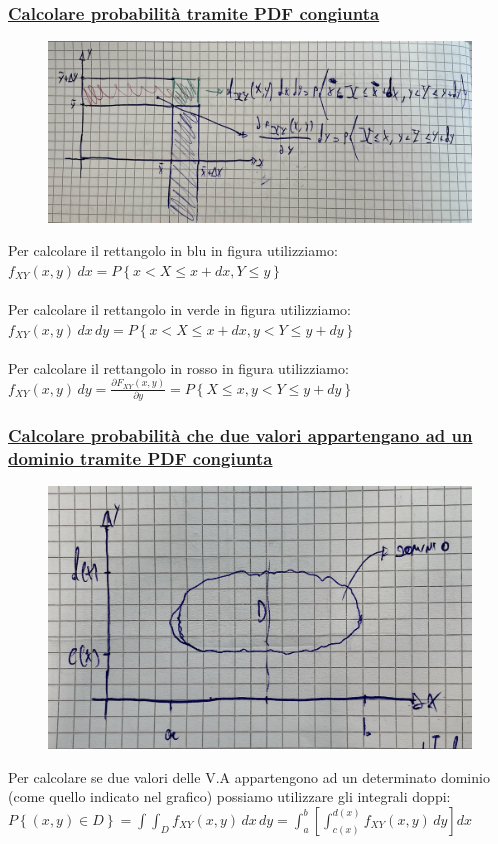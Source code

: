 \documentclass{article}
\begin{document}
\subsubsection{\underline{Calcolare probabilità tramite PDF congiunta}}
\begin{figure}[H]
\centering
\includegraphics[scale=0.14]{images/78.CalcoloProbPDFCong.jpeg}
\end{figure} 
Per calcolare il rettangolo in blu in figura utilizziamo: \\
$f_{XY}(x,y)\,dx = P \left\{x < X \leq x + dx,Y \leq y\right\}$ \\ \\
Per calcolare il rettangolo in verde in figura utilizziamo: \\
$f_{XY}(x,y)\,dx\,dy = P \left\{x < X \leq x + dx, y < Y \leq y +dy\right\}$ \\ \\
Per calcolare il rettangolo in rosso in figura utilizziamo: \\
$f_{XY}(x,y)\,dy = \frac{\partial F_{XY}(x,y)}{\partial y} = P \left\{X \leq x ,y < Y \leq y + dy \right\}$
\subsubsection{\underline{Calcolare probabilità che due valori appartengano ad un dominio tramite PDF congiunta}}
\begin{figure}[H]
\centering
\includegraphics[scale=0.14]{images/79.Prob_VA_inDom.jpeg}
\end{figure} 
Per calcolare se due valori delle V.A appartengono ad un determinato dominio (come quello indicato nel grafico) possiamo utilizzare gli integrali doppi: \\
$P \left\{(x,y) \in D \right\} = \int \int_D f_{XY}(x,y) \,dx\,dy = \int_{a}^{b} \left[ \int_{c(x)}^{d(x)} f_{XY}(x,y) \,dy \right] dx$
\end{document}
